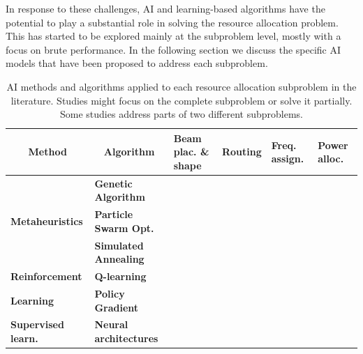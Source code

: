 \documentclass[letterpaper]{article} %
\begin{document}
In response to these challenges, AI and learning-based algorithms have the potential to play a substantial role in solving the resource allocation problem. This has started to be explored mainly at the subproblem level, mostly with a focus on brute performance. In the following section we discuss the specific AI models that have been proposed to address each subproblem.


\begin{table}
\begin{center}
\begin{tabular}{|l|l|m{3cm}|m{2cm}|m{2cm}|m{2cm}|}
\hline
\multicolumn{1}{|c|}{\textbf{Method}} & \multicolumn{1}{c|}{\textbf{Algorithm}} & \textbf{Beam plac. \& shape}  & \textbf{Routing}   & \textbf{Freq. assign.}   & \textbf{Power alloc.}   \\ \hline
& \textbf{Genetic Algorithm}    & \citeyear{wangdynamic, Deng2018, He2017, Anzalchi2010, Angeletti2006} &  \citeyear{rao2011performance}  & \citeyear{He2017, tirmizi2015efficient, Angeletti2006, Paris2019} & \citeyear{Aravanis2015, Anzalchi2010, Paris2019} \\ \cline{2-6}
\textbf{Metaheuristics}  & \textbf{Particle Swarm Opt.}   &   &     & \citeyear{pachler20b}  & \citeyear{Durand2017, pachler20b} \\ \cline{2-6}
& \textbf{Simulated Annealing} & \citeyear{Camino2014} &  & \citeyear{vidal2020joint, Cocco2018, Camino2014} & \citeyear{vidal2020joint, Cocco2018}   \\ \hline
\textbf{Reinforcement} & \textbf{Q-learning}  &  \citeyear{hu2020dynamic}  &  \citeyear{gong2020adaptive}  & \citeyear{liao2020distributed, zheng2020leo, Ferreira2018, Hu2018ASystems}   & \citeyear{zhang2020online, liao2020distributed, Ferreira2018}  \\ \cline{2-6}
\textbf{Learning}   & \textbf{Policy Gradient}  &   &    &    & \citeyear{Luis2019, Luis2020} \\ \hline
\textbf{Supervised learn.}  & \textbf{Neural architectures}  &  &  & \citeyear{Funabiki1997, Salcedo-Sanz2005}  & \\ \hline
\end{tabular}
\end{center}
\caption{AI methods and algorithms applied to each resource allocation subproblem in the literature. Studies might focus on the complete subproblem or solve it partially. Some studies address parts of two different subproblems.}
\label{tab:literature}
\end{table}
\end{document}
